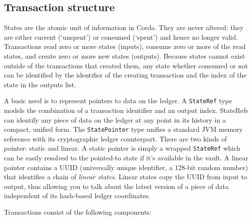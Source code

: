 \documentclass{article}
\begin{document}
\subsection{Transaction structure}\label{subsec:transaction-structure}

States are the atomic unit of information in Corda. They are never altered: they are either current (`unspent') or
consumed (`spent') and hence no longer valid.  Transactions read zero or more states (inputs), consume zero or more
of the read states, and create zero or more new states (outputs). Because states cannot exist outside of the
transactions that created them, any state whether consumed or not can be identified by the identifier of the
creating transaction and the index of the state in the outputs list.

A basic need is to represent pointers to data on the ledger. A \texttt{StateRef} type models the combination of a
transaction identifier and an output index. StateRefs can identify any piece of data on the ledger at any point in
its history in a compact, unified form. The \texttt{StatePointer} type unifies a standard JVM memory reference with
its cryptographic ledger counterpart. There are two kinds of pointer: static and linear. A static pointer is simply
a wrapped \texttt{StateRef} which can be easily resolved to the pointed-to state if it's available in the vault. A
linear pointer contains a UUID (universally unique identifier, a 128-bit random number) that identifies a chain of
\emph{linear states}. Linear states copy the UUID from input to output, thus allowing you to talk about the latest
version of a piece of data independent of its hash-based ledger coordinates.

Transactions consist of the following components:
\end{document}
